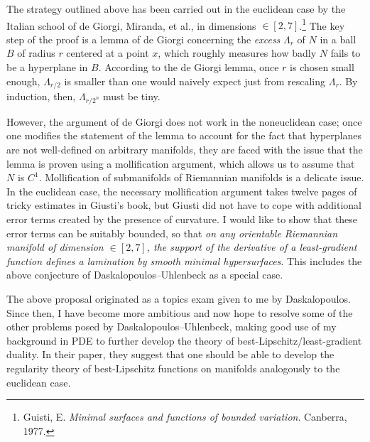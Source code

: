 \documentclass[12pt]{article}
\begin{document}
The strategy outlined above has been carried out in the euclidean case by the Italian school of de Giorgi, Miranda, et al., in dimensions $\in [2, 7]$.\footnote{Guisti, E. \emph{Minimal surfaces and functions of bounded variation}. Canberra, 1977.}
The key step of the proof is a lemma of de Giorgi concerning the \emph{excess} $\Lambda_r$ of $N$ in a ball $B$ of radius $r$ centered at a point $x$, which roughly measures how badly $N$ fails to be a hyperplane in $B$.
According to the de Giorgi lemma, once $r$ is chosen small enough, $\Lambda_{r/2}$ is smaller than one would naively expect just from rescaling $\Lambda_r$.
By induction, then, $\Lambda_{r/2^n}$ must be tiny.

However, the argument of de Giorgi does not work in the noneuclidean case; once one modifies the statement of the lemma to account for the fact that hyperplanes are not well-defined on arbitrary manifolds, they are faced with the issue that the lemma is proven using a mollification argument, which allows us to assume that $N$ is $C^1$.
Mollification of submanifolds of Riemannian manifolds is a delicate issue.
In the euclidean case, the necessary mollification argument takes twelve pages of tricky estimates in Giusti's book, but Giusti did not have to cope with additional error terms created by the presence of curvature.
I would like to show that these error terms can be suitably bounded, so that \emph{on any orientable Riemannian manifold of dimension $\in [2, 7]$, the support of the derivative of a least-gradient function defines a lamination by smooth minimal hypersurfaces}.
This includes the above conjecture of Daskalopoulos--Uhlenbeck as a special case.

The above proposal originated as a topics exam given to me by Daskalopoulos.
Since then, I have become more ambitious and now hope to resolve some of the other problems posed by Daskalopoulos--Uhlenbeck, making good use of my background in PDE to further develop the theory of best-Lipschitz/least-gradient duality.
In their paper, they suggest that one should be able to develop the regularity theory of best-Lipschitz functions on manifolds analogously to the euclidean case.
\end{document}
